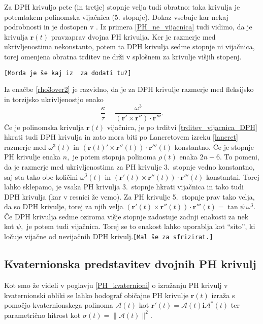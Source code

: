 \documentclass[12pt,a4paper,twoside]{article}
\theoremstyle{definition} %
\theoremstyle{plain} %
\numberwithin{equation}{section}  %
\newcommand{\rV}{\mathbf{r}}
\newcommand{\iV}{\mathbf{i}}
\newcommand{\AQ}{\mathcal{A}}
\begin{document}
Za DPH krivuljo pete (in tretje) stopnje velja tudi obratno: taka krivulja je potemtakem polinomska vijačnica (5. stopnje). Dokaz vsebuje kar nekaj podrobnosti in je dostopen v \cite{beltranmonterde}. Iz primera \ref{PH_ne_vijacnica} tudi vidimo, da je krivulja $\rV(t)$ pravzaprav dvojna PH krivulja. Ker je razmerje med ukrivljenostima nekonstanto, potem ta DPH krivulja sedme stopnje ni vijačnica, torej omenjena obratna trditev ne drži v splošnem za krivulje višjih stopenj.

\texttt{[Morda je še kaj iz \cite{beltranmonterde} za dodati tu?]} 

Iz enačbe \eqref{rho3over2} je razvidno, da je za DPH krivulje razmerje med fleksijsko in torzijsko ukrivljenostjo enako
\begin{equation}
	\frac{\kappa}{\tau}=\frac{\omega^3}{(\rV'\times\rV'')\cdot\rV'''}.
\end{equation}
Če je polinomska krivulja $\rV(t)$ vijačnica, je po trditvi \eqref{trditev_vijacnica_DPH} hkrati tudi DPH krivulja in zato mora biti po Lancretovem izreku \ref{lancret} razmerje med $\omega^3(t)$ in $(\rV(t)'\times\rV''(t))\cdot\rV'''(t)$ konstantno. Če je stopnje PH krivulje enaka $n,$ je potem stopnja polinoma $\rho(t)$ enaka $2n-6.$ To pomeni, da je razmerje med ukrivljenostima za PH krivulje 3.\ stopnje vedno konstantno, saj sta tako obe količini $\omega^3(t)$ in $(\rV'(t)\times\rV''(t))\cdot\rV'''(t)$ konstantni. Torej lahko sklepamo, je vsaka PH krivulja 3.\ stopnje hkrati vijačnica in tako tudi DPH krivulja (kar v resnici že vemo). Za PH krivulje 5.\ stopnje prav tako velja, da so DPH krivulje, torej za njih velja $(\rV'(t)\times\rV''(t))\cdot\rV'''(t)=\tan \psi\ \omega^3.$ Če DPH krivulja sedme oziroma višje stopnje zadostuje zadnji enakosti za nek kot $\psi,$ je potem tudi vijačnica. Torej se to enakost lahko uporablja kot ``sito'', ki ločuje vijačne od nevijačnih DPH krivulj.\texttt{[Mal še za sfrizirat.]}

\subsection{Kvaternionska predstavitev dvojnih PH krivulj}

Kot smo že videli v poglavju \ref{PH_kvaternioni} o izražanju PH krivulj v kvaternionski obliki se lahko hodograf običajne PH krivulje $\rV(t)$ izraža s pomočjo kvaternionskega polinoma $\AQ(t)$ kot $\rV'(t)=\AQ(t)\iV\AQ^*(t)$ ter parametrično hitrost kot $\sigma(t)=\lVert \AQ(t) \rVert^2.$ 
\end{document}
